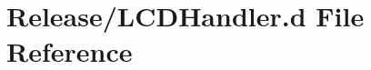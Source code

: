 \hypertarget{_l_c_d_handler_8d}{}\section{Release/\+L\+C\+D\+Handler.d File Reference}
\label{_l_c_d_handler_8d}
